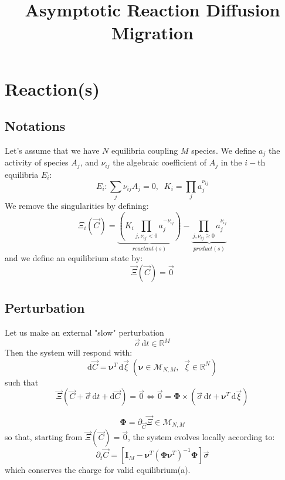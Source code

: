\documentclass[aps,12pt]{revtex4}
\begin{document}
\title{Asymptotic Reaction Diffusion Migration}
\maketitle

\section{Reaction(s)}

\subsection{Notations}
Let's assume that we have $N$ equilibria coupling $M$ species.
We define $a_j$ the activity of species $A_j$, and $\nu_{ij}$ the algebraic
coefficient of $A_j$ in the $i-$th equilibria $E_i$:
\begin{equation}
	E_i : \sum_j \nu_{ij} A_j = 0, \;\;K_i = \prod_j a_j^{\nu_{ij}}
\end{equation}
We remove the singularities by defining:
\begin{equation}
	\Xi_i(\vec C) = \underbrace{(K_i \prod_{j,\nu_{ij}<0} a_j^{-\nu_{ij}})}_{reactant(s)} - \underbrace{\prod_{j,\nu_{ij}\geq0} a_j^{\nu_{ij}}}_{product(s)}
\end{equation}
and we define an equilibrium state by:
\begin{equation}
	\vec \Xi ( \vec C ) = \vec 0
\end{equation}

\subsection{Perturbation}
Let us make an external "slow" perturbation 
\begin{equation}
	\vec \sigma \, \mathrm{d} t \in \mathbb R ^M
\end{equation}
Then the system will respond with:
\begin{equation}
	\mathrm{d} \vec C = \bm{\nu}^T \, \mathrm{d}\vec \xi\; (\bm{\nu} \in \mathcal M_{N,M},\;\; \vec \xi \in \mathbb R ^N)
\end{equation}
such that
\begin{equation}
	\vec \Xi(\vec C + \vec \sigma \, \mathrm{d} t + \mathrm{d} \vec C ) = \vec 0 \iff \vec 0 = 
	\bm{\Phi} \times ( \vec \sigma \, \mathrm{d} t + \bm{\nu}^T \, \mathrm{d}\vec \xi)
\end{equation}

\begin{equation}
	\bm{\Phi} = \partial_{\vec C} \vec \Xi \in \mathcal M_{N,M}
\end{equation}
so that, starting from $\vec \Xi ( \vec C ) = \vec 0$, the system evolves locally according to:
\begin{equation}
\boxed{
	\partial_t \vec C = \left[\bm{I}_M - \bm{\nu}^T (\bm \Phi \bm{\nu}^T) ^{-1} \bm \Phi \right] \vec \sigma
	}
\end{equation}
which conserves the charge for valid equilibrium(a).
\end{document}
